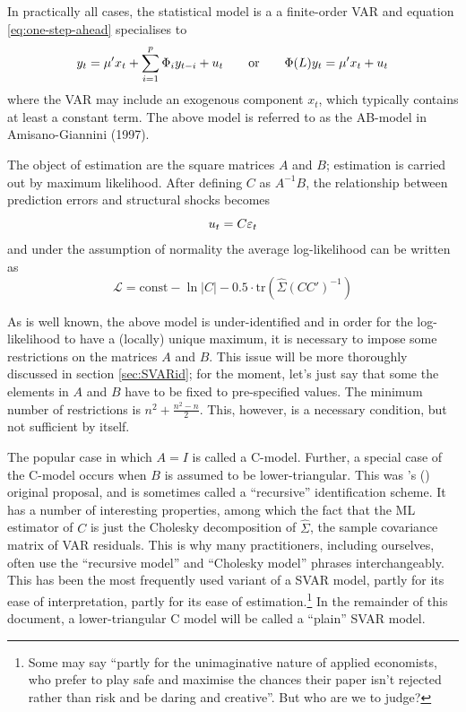 \documentclass[a4paper,10pt]{article}
\newcommand{\PrE}[1]{\ensuremath u_{#1}} %
\newcommand{\StS}[1]{\ensuremath \varepsilon_{#1}} %
\newcommand{\VarSym}{\ensuremath \Phi}
\begin{document}
In practically all cases, the statistical model is a a finite-order
VAR and equation \eqref{eq:one-step-ahead} specialises to
\begin{equation}
  \label{eq:VAR}
  y_t = \mu' x_t + \sum_{i=1}^p \VarSym_i y_{t-i} + \PrE{t}
  \qquad\mathrm{or}\qquad
  \VarSym(L) y_t = \mu' x_t + \PrE{t}
\end{equation}
where the VAR may include an exogenous component $x_t$, which
typically contains at least a constant term. The above model is
referred to as the AB-model in Amisano-Giannini (1997).

The object of estimation are the square matrices $A$ and $B$;
estimation is carried out by maximum likelihood. After defining $C$ as
$A^{-1}B$, the relationship between prediction errors and structural
shocks becomes
\begin{equation}
  \label{eq:PrE-StS-C}
  \PrE{t} = C \StS{t}
\end{equation}
and under the assumption of normality the average log-likelihood can
be written as
\[
  \mathcal{L} = \mathrm{const} - \ln |C| - 0.5 \cdot
  \mathrm{tr}(\hat{\Sigma} (CC')^{-1}) 
\]

As is well known, the above model is under-identified and in order for
the log-likelihood to have a (locally) unique maximum, it is necessary
to impose some restrictions on the matrices $A$ and $B$. This issue
will be more thoroughly discussed in section \ref{sec:SVARid}; for the
moment, let's just say that some the elements in $A$ and $B$ have to
be fixed to pre-specified values. The minimum number of restrictions
is $n^2 + \frac{n^2 - n}{2}$. This, however, is a necessary condition,
but not sufficient by itself.

The popular case in which $A=I$ is called a C-model. Further, a
special case of the C-model occurs when $B$ is assumed to be
lower-triangular. This was \citeauthor{sims80}'s (\citeyear{sims80})
original proposal, and is sometimes called a ``recursive''
identification scheme. It has a number of interesting properties,
among which the fact that the ML estimator of $C$ is just the Cholesky
decomposition of $\hat{\Sigma}$, the sample covariance matrix of VAR
residuals. This is why many practitioners, including ourselves, often
use the ``recursive model'' and ``Cholesky model'' phrases
interchangeably.  This has been the most frequently used variant of a
SVAR model, partly for its ease of interpretation, partly for its ease
of estimation.\footnote{Some may say ``partly for the unimaginative
  nature of applied economists, who prefer to play safe and maximise
  the chances their paper isn't rejected rather than risk and be
  daring and creative''. But who are we to judge?} In the remainder of
this document, a lower-triangular C model will be called a ``plain''
SVAR model.
\end{document}
